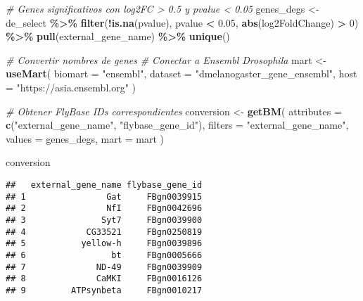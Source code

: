\documentclass[
]{article}
\newenvironment{Shaded}{\begin{snugshade}}{\end{snugshade}}
\newcommand{\AttributeTok}[1]{\textcolor[rgb]{0.13,0.29,0.53}{#1}}
\newcommand{\CommentTok}[1]{\textcolor[rgb]{0.56,0.35,0.01}{\textit{#1}}}
\newcommand{\DecValTok}[1]{\textcolor[rgb]{0.00,0.00,0.81}{#1}}
\newcommand{\FloatTok}[1]{\textcolor[rgb]{0.00,0.00,0.81}{#1}}
\newcommand{\FunctionTok}[1]{\textcolor[rgb]{0.13,0.29,0.53}{\textbf{#1}}}
\newcommand{\NormalTok}[1]{#1}
\newcommand{\OtherTok}[1]{\textcolor[rgb]{0.56,0.35,0.01}{#1}}
\newcommand{\SpecialCharTok}[1]{\textcolor[rgb]{0.81,0.36,0.00}{\textbf{#1}}}
\newcommand{\StringTok}[1]{\textcolor[rgb]{0.31,0.60,0.02}{#1}}
\begin{document}
\begin{Shaded}
\begin{Highlighting}[]
\CommentTok{\# Genes significativos con log2FC \textgreater{} 0.5 y pvalue \textless{} 0.05}
\NormalTok{genes\_degs }\OtherTok{\textless{}{-}}\NormalTok{ de\_select }\SpecialCharTok{\%\textgreater{}\%}
  \FunctionTok{filter}\NormalTok{(}\SpecialCharTok{!}\FunctionTok{is.na}\NormalTok{(pvalue), pvalue }\SpecialCharTok{\textless{}} \FloatTok{0.05}\NormalTok{, }\FunctionTok{abs}\NormalTok{(log2FoldChange) }\SpecialCharTok{\textgreater{}} \DecValTok{0}\NormalTok{) }\SpecialCharTok{\%\textgreater{}\%}
  \FunctionTok{pull}\NormalTok{(external\_gene\_name) }\SpecialCharTok{\%\textgreater{}\%}
  \FunctionTok{unique}\NormalTok{()}

\CommentTok{\# Convertir nombres de genes}
\CommentTok{\# Conectar a Ensembl Drosophila}
\NormalTok{mart }\OtherTok{\textless{}{-}} \FunctionTok{useMart}\NormalTok{(}
  \AttributeTok{biomart =} \StringTok{"ensembl"}\NormalTok{,}
  \AttributeTok{dataset =} \StringTok{"dmelanogaster\_gene\_ensembl"}\NormalTok{,}
  \AttributeTok{host =} \StringTok{"https://asia.ensembl.org"}
\NormalTok{)}

\CommentTok{\# Obtener FlyBase IDs correspondientes}
\NormalTok{conversion }\OtherTok{\textless{}{-}} \FunctionTok{getBM}\NormalTok{(}
  \AttributeTok{attributes =} \FunctionTok{c}\NormalTok{(}\StringTok{"external\_gene\_name"}\NormalTok{, }\StringTok{"flybase\_gene\_id"}\NormalTok{),}
  \AttributeTok{filters =} \StringTok{"external\_gene\_name"}\NormalTok{,}
  \AttributeTok{values =}\NormalTok{ genes\_degs,}
  \AttributeTok{mart =}\NormalTok{ mart}
\NormalTok{)}

\NormalTok{conversion}
\end{Highlighting}
\end{Shaded}

\begin{verbatim}
##   external_gene_name flybase_gene_id
## 1                Gat     FBgn0039915
## 2                NfI     FBgn0042696
## 3               Syt7     FBgn0039900
## 4            CG33521     FBgn0250819
## 5           yellow-h     FBgn0039896
## 6                 bt     FBgn0005666
## 7              ND-49     FBgn0039909
## 8              CaMKI     FBgn0016126
## 9         ATPsynbeta     FBgn0010217
\end{verbatim}

\begin{Shaded}
\end{Shaded}
\end{document}

